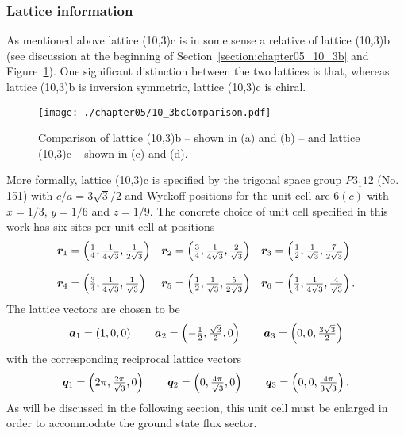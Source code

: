 \subsubsection{Lattice information}
%
%
As mentioned above lattice (10,3)c is in some sense a relative of lattice (10,3)b (see discussion at the beginning of Section~\ref{section:chapter05_10_3b} and Figure~\ref{fig:chapter05_10_3bcComparison}).
One significant distinction between the two lattices is that, whereas lattice (10,3)b is inversion symmetric, lattice (10,3)c is chiral.
%
\begin{figure}[tb]
	\centering
	\texttt{[image: ./chapter05/10\_3bcComparison.pdf]}
	\caption{
		Comparison of lattice (10,3)b -- shown in (a) and (b) -- and lattice (10,3)c -- shown in (c) and (d).
	}
	\label{fig:chapter05_10_3bcComparison}
\end{figure}
%

More formally, lattice (10,3)c is specified by the trigonal space group $P3_{1}12$ (No. 151) with $c/a = 3\sqrt{3}/2$ and Wyckoff positions for the unit cell are $6(c)$ with $x = 1/3$, $y = 1/6$ and $z = 1/9$.
The concrete choice of unit cell specified in this work has six sites per unit cell at positions
%
\begin{equation}
	\begin{matrix*}[l]
		\br_1 = \left(\frac{1}{4}, \frac{1}{4\sqrt{3}}, \frac{1}{2\sqrt{3}}\right) &
		\br_2 = \left(\frac{3}{4}, \frac{1}{4\sqrt{3}}, \frac{2}{\sqrt{3}}\right) &
		\br_3 = \left(\frac{1}{2}, \frac{1}{\sqrt{3}}, \frac{7}{2\sqrt{3}}\right) \\
		&\\
		\br_4 = \left(\frac{3}{4}, \frac{1}{4\sqrt{3}}, \frac{1}{\sqrt{3}}\right) &
		\br_5 = \left(\frac{1}{2}, \frac{1}{\sqrt{3}}, \frac{5}{2\sqrt{3}}\right) &
		\br_6 = \left(\frac{1}{4}, \frac{1}{4\sqrt{3}}, \frac{4}{\sqrt{3}}\right).
	\end{matrix*}
\end{equation}
%
The lattice vectors are chosen to be
%
\begin{equation}
	\begin{matrix*}[l]
		\ba_1 = \left(1, 0, 0\right) \qquad
		\ba_2 = \left(-\frac{1}{2}, \frac{\sqrt{3}}{2}, 0\right) \qquad
		\ba_3 = \left(0, 0, \frac{3\sqrt{3}}{2}\right)
	\end{matrix*}
\end{equation}
%
with the corresponding reciprocal lattice vectors
%
\begin{equation}
	\begin{matrix*}[l]
		\bq_1 = \left(2\pi, \frac{2\pi}{\sqrt{3}}, 0\right) \qquad
		\bq_2 = \left(0, \frac{4\pi}{\sqrt{3}}, 0\right) \qquad
		\bq_3 = \left(0, 0, \frac{4\pi}{3\sqrt{3}}\right).
	\end{matrix*}
\end{equation}
%
As will be discussed in the following section, this unit cell must be enlarged in order to accommodate the ground state flux sector.

